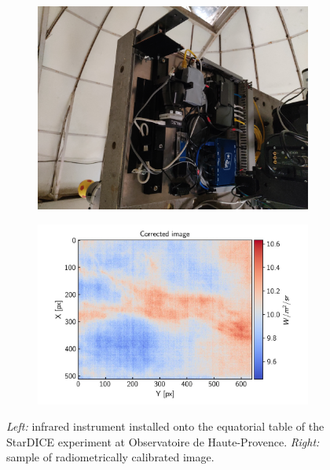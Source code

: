 \documentclass[remotesensing,article,submit,pdftex,moreauthors]{Definitions/mdpi}
\begin{document}
\begin{figure}
    \centering
    
    \begin{subfigure}[b]{0.4\textwidth}
        \includegraphics[width=\textwidth]{figures/infrared_instrument.jpg}
        \label{fig:subfig1}
    \end{subfigure}
    \hfill
    \begin{subfigure}[b]{0.5\textwidth}
        \includegraphics[width=\textwidth]{figures/calibrated_sky_image.jpg}
        \label{fig:subfig2}
    \end{subfigure}
    
    \caption{\textit{Left:} infrared instrument installed onto the equatorial table of the StarDICE experiment at Observatoire de Haute-Provence. \textit{Right:} sample of radiometrically calibrated image.}
    \label{fig:side_by_side}
\end{figure}
\end{document}
